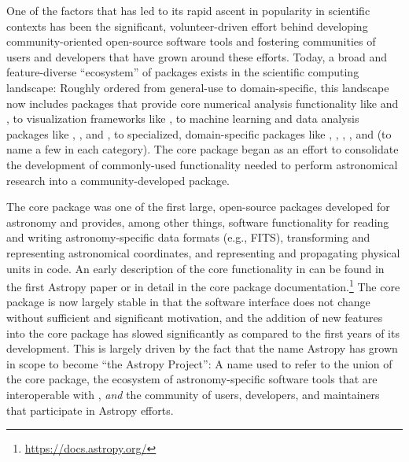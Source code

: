 \documentclass[modern]{aastex631}
\begin{document}
One of the factors that has led to its rapid ascent in popularity in scientific
contexts has been the significant, volunteer-driven effort behind developing
community-oriented open-source software tools and fostering communities of users
and developers that have grown around these efforts.
Today, a broad and feature-diverse ``ecosystem'' of packages exists in the
\python scientific computing landscape: Roughly ordered from general-use to
domain-specific, this landscape now includes packages that provide core
numerical analysis functionality like  \citep{todo} and
 \citep{todo}, to visualization frameworks like
 \citep{todo}, to machine learning and data analysis
packages like  \citep{todo},  \citep{todo},
and  \citep{todo}, to specialized, domain-specific packages like
 \citep{todo},  \citep{todo}, 
\citep{todo},  \citep{todo}, and 
\citep{sympy} (to name a few in each category).
The \astropypkg \citep{astropy:2013, astropy:2018} core package began as an
effort to consolidate the development of commonly-used functionality needed to
perform astronomical research into a community-developed \python package.

The \astropypkg core package was one of the first large, open-source \python
packages developed for astronomy and provides, among other things, software
functionality for reading and writing astronomy-specific data formats (e.g.,
FITS), transforming and representing astronomical coordinates, and representing
and propagating physical units in code.
An early description of the core functionality in \astropypkg can be found in
the first Astropy paper \citep{astropy:2013} or in detail in the core package
documentation.\footnote{\url{https://docs.astropy.org/}}
The \astropypkg core package is now largely stable in that the software
interface does not change without sufficient and significant motivation, and the
addition of new features into the core package has slowed significantly as
compared to the first years of its development.
This is largely driven by the fact that the name Astropy has grown in scope to
become ``the Astropy Project'': A name used to refer to the union of the
\astropypkg core package, the ecosystem of astronomy-specific software tools
that are interoperable with \astropypkg, \emph{and} the community of users,
developers, and maintainers that participate in Astropy efforts.


\end{document}
